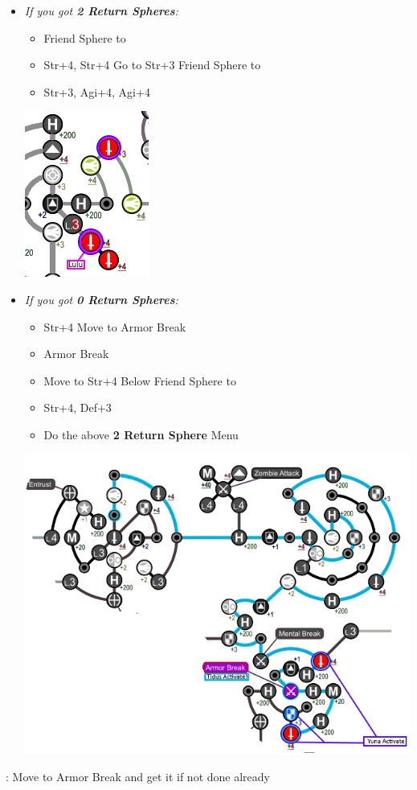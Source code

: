 \begin{spheregrid}
\begin{multicols}{2}
\begin{itemize}
\begin{itemize}
		\columnbreak
		\item \textit{If you got \textbf{2 Return Spheres}:}
		\begin{itemize}
			\item Friend Sphere to \lulu
			\item Str+4, Str+4
			\luluf Go to Str+3
			\yunaf Friend Sphere to \lulu
			\item Str+3, Agi+4, Agi+4
		\end{itemize}
		\includegraphics[width=.4\columnwidth]{graphics/2_and_2}
		\item \textit{If you got \textbf{0 Return Spheres}:}
		\begin{itemize}
			\tidusf Move to Str+4 by Armor Break
			\yunaf Friend Sphere to \tidus
			\item Str+4
			\tidusf Move to Armor Break
			\item Armor Break
			\item Move to Str+4 Below
			\yunaf Friend Sphere to \tidus
			\item Str+4, Def+3
			\item Do the above \textbf{2 Return Sphere} Menu
		\end{itemize}
		\includegraphics[width=.9\columnwidth]{graphics/0_returns}
	\end{itemize}
	\tidusf: Move to Armor Break and get it if not done already
\end{itemize}
\end{multicols}
\end{spheregrid}
